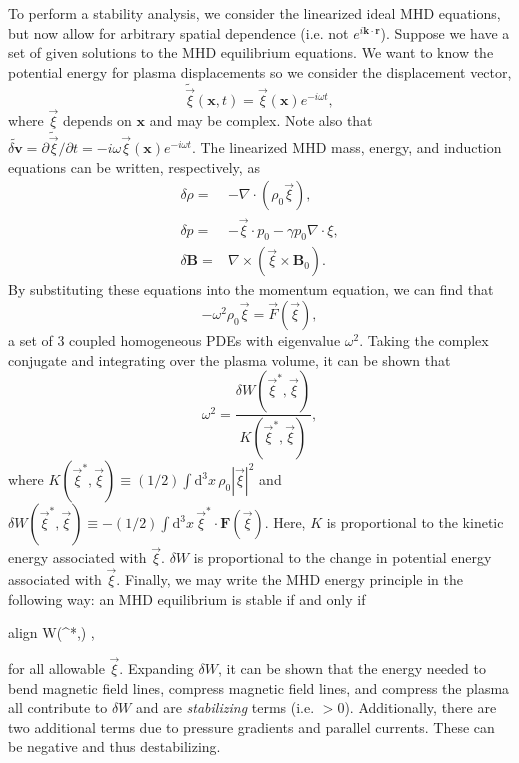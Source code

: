 	To perform a stability analysis, we consider the linearized ideal MHD equations, but now allow for arbitrary spatial dependence (i.e. not $e^{i\mathbf{k}\cdot\mathbf{r}}$). Suppose we have a set of given solutions to the MHD equilibrium equations. We want to know the potential energy for plasma displacements so we consider the displacement vector,
	\begin{equation}
		\tilde{\vec{\xi}}(\mathbf{x},t) = \vec{\xi}(\mathbf{x})e^{-i\omega t},   
	\end{equation}
	where $\vec{\xi}$ depends on $\mathbf{x}$ and may be complex. Note also that $\tilde{\delta\mathbf{v}} = \partial\tilde{\vec{\xi}}/\partial t=-i\omega\vec{\xi}(\mathbf{x})e^{-i\omega t}$. The linearized MHD mass, energy, and induction equations can be written, respectively, as
	\begin{align}
		\delta\rho =& -\nabla\cdot(\rho_0\vec{\xi}), \\
		\delta p =& -\vec{\xi}\cdot p_0 - \gamma p_0\nabla\cdot\xi, \\
		\delta\mathbf{B} =& \nabla\times(\vec{\xi}\times\mathbf{B}_0).
	\end{align}
	By substituting these equations into the momentum equation, we can find that 
	\begin{equation}
		-\omega^2\rho_0\vec{\xi} = \vec{F}(\vec{\xi}),
	\end{equation}
	a set of 3 coupled homogeneous PDEs with eigenvalue $\omega^2$. Taking the complex conjugate and integrating over the plasma volume, it can be shown that
	\begin{equation}
		\omega^2 = \frac{\delta W(\vec{\xi}^{*},\vec{\xi})}{K(\vec{\xi}^{*},\vec{\xi})},
	\end{equation}
	where $K(\vec{\xi}^{*},\vec{\xi})\equiv(1/2)\int\mathrm{d}^3x\,\rho_0|\vec{\xi}|^2$ and $\delta W(\vec{\xi}^{*},\vec{\xi})\equiv-(1/2)\int\mathrm{d}^3x\,\vec{\xi}^{*}\cdot\mathbf{F}(\vec{\xi})$. Here, $K$ is proportional to the kinetic energy associated with $\vec{\xi}$. $\delta W$ is proportional to the change in potential energy associated with $\vec{\xi}$. Finally, we may write the MHD energy principle in the following way: an MHD equilibrium is stable if and only if
	\begin{empheq}[box=\widefbox]{align}
		\delta W(\vec{\xi}^{*},\vec{\xi}) ,
	\end{empheq}
	for all allowable $\vec{\xi}$. Expanding $\delta W$, it can be shown that the energy needed to bend magnetic field lines, compress magnetic field lines, and compress the plasma all contribute to $\delta W$ and are \textit{stabilizing} terms (i.e. $>0$). Additionally, there are two additional terms due to pressure gradients and parallel currents. These can be negative and thus destabilizing.  
